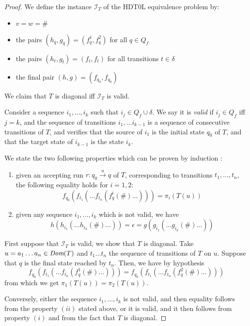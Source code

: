 \documentclass{llncs}
\begin{document}
\begin{proof}
We define the instance $\mathcal{I}_T$ of the
HDT0L equivalence problem by:

\begin{itemize}
    \item $v=w=\#$
    \item the pairs $(h_q,g_q) = (f_q^1,f_q^2)$ for all $q\in Q_f$
    \item the pairs $(h_t,g_t) = (f_t,f_t)$ for all transitions $t\in\delta$
    \item the final pair $(h,g) = (f_{q_0}, f_{q_0})$
\end{itemize}

We claim that $T$ is diagonal iff $\mathcal{I}_T$ is valid.

Consider a sequence $i_1,\ldots,i_k$ such that $i_j\in Q_f \cup \delta$.
We say it is \emph{valid} if $i_j\in Q_f$ iff $j=k$, and the sequence of transitions $i_1,\ldots i_{k-1}$
is a sequence of consecutive transitions of $T$, and verifies that the source of $i_1$ is the initial state $q_0$ of $T$, 
and that the target state of $i_{k-1}$ is the state $i_k$.

We state the two following properties which can be proven by induction :
\begin{enumerate}[$(i)$]
\item given an accepting run $r : q_0 \xrightarrow{u} q$ of $T$, corresponding to transitions 
$t_1,\ldots,t_n$, the following equality holds for $i=1,2$:
$$f_{q_0}(f_{t_1}(\dots f_{t_n}(f_q^i(\#)\dots))) = \pi_i(T(u))$$
\item given any sequence $i_1,\ldots,i_k$ which is not valid, we have 
$$h(h_{i_1}(\dots h_{i_k}(\#)\dots)) = \epsilon =  g(g_{i_1}(\dots g_{i_k}(\#)\dots))$$
\end{enumerate}

First suppose that $\mathcal{I}_T$ is valid, we show that $T$ is diagonal. Take
$u=a_1\dots a_n\in \textit{Dom}(T)$ and $t_1\dots t_n$ the sequence of
transitions of $T$ on $u$. Suppose that $q$ is the final state reached
by $t_n$. Then, we have by hypothesis 
$$
f_{q_0}(f_{t_1}(\dots f_{t_n}(f_q^1(\#)\dots))) = 
f_{q_0}(f_{t_1}(\dots f_{t_n}(f_q^2(\#)\dots)))
$$
from which we get $\pi_1(T(u)) = \pi_2(T(u))$.


Conversely, either the sequence $i_1,\ldots,i_k$ is not valid, and then equality follows from the  
property $(ii)$ stated above, or it is valid, and it then follows from property $(i)$ and from the fact that $T$
is diagonal.
\end{proof}
\end{document}
